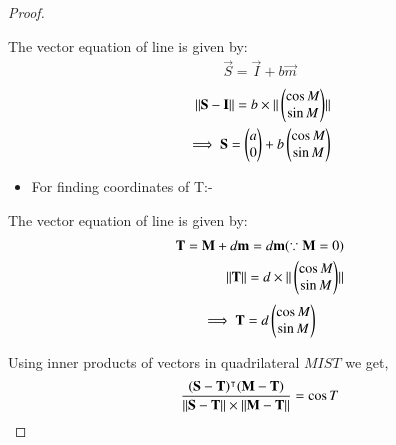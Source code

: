 \documentclass[journal,12pt,twocolumn]{IEEEtran}
\begin{document}
\begin{enumerate}
\begin{proof}
\begin{itemize}
\end{itemize}
The vector equation of line is given by:
\begin{align}
\vec{S}=\vec{I} + b \vec{m} 
\end{align}
\begin{align}
\Vert\mathbf{S}-\mathbf{I}\rVert= b\times \Vert\begin{pmatrix}\cos M\\\sin M\end{pmatrix}\rVert 
\\
\implies \mathbf{S}=\begin{pmatrix}a\\0\end{pmatrix} + b\begin{pmatrix}\cos M \\\sin M \end{pmatrix} \label{eq13}
\end{align}
\begin{itemize}
\item For finding coordinates of T:-
\end{itemize}
The vector equation of line is given by:
\begin{align}
\mathbf{T}=\mathbf{M} + d\mathbf{m} =d\mathbf{m} (\because \mathbf{M}=0) 
\\
\Vert\mathbf{T}\rVert=d\times\Vert\begin{pmatrix}\cos M\\\sin M\end{pmatrix}\rVert 
\end{align}
\begin{align}
\implies \mathbf{T}=d \begin{pmatrix}\cos M\\\sin M \end{pmatrix} \label{eq15}
\end{align}
\item Using inner products of vectors in quadrilateral $MIST$ we get,
\begin{align}
\frac{\mathbf{(S-T)}^\intercal\mathbf{(M-T)}}{\Vert\mathbf{S-T}\rVert\times\Vert\mathbf{M-T}\rVert}=\cos T 
\end{align}


\end{proof}
\end{enumerate}
\end{document}
